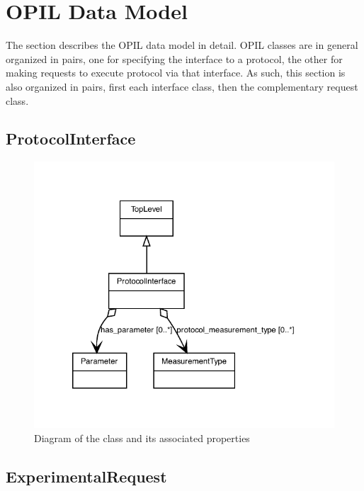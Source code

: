 
\section{OPIL Data Model}\label{sec:model}

The section describes the OPIL data model in detail.  
OPIL classes are in general organized in pairs, one for specifying the interface to a protocol, the other for making requests to execute protocol via that interface.
As such, this section is also organized in pairs, first each interface class, then the complementary request class.



\subsection{ProtocolInterface}
\label{sec:ProtocolInterface}

\begin{figure}[ht]
\begin{center}
\includegraphics[scale=0.6]{figures/ProtocolInterface}
\caption[]{Diagram of the  class and its associated properties}
\label{uml:ProtocolInterface}
\end{center}
\end{figure}


\subsection{ExperimentalRequest}
\label{sec:ExperimentalRequest}

